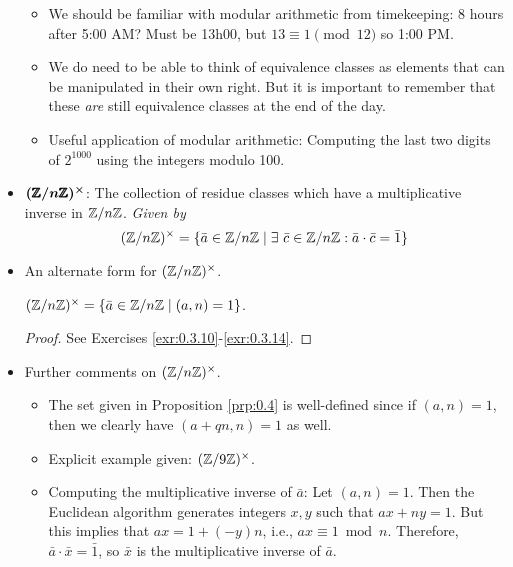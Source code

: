 \documentclass[../notes.tex]{subfiles}
\begin{document}
\begin{itemize}
\begin{itemize}
        \item We should be familiar with modular arithmetic from timekeeping: 8 hours after 5:00 AM? Must be 13h00, but $13\equiv 1\pmod 12$ so 1:00 PM.
        \item We do need to be able to think of equivalence classes as elements that can be manipulated in their own right. But it is important to remember that these \emph{are} still equivalence classes at the end of the day.
        \item Useful application of modular arithmetic: Computing the last two digits of $2^{1000}$ using the integers modulo 100.
    \end{itemize}
    \item $\bm{(\pmb{\mathbb{Z}}/n\pmb{\mathbb{Z}})^\times}$: The collection of residue classes which have a multiplicative inverse in $\mathbb{Z}/n\mathbb{Z}$. \emph{Given by}
    \begin{equation*}
        (\Z/n\Z)^\times = \{\bar{a}\in\Z/n\Z\mid \exists\ \bar{c}\in\Z/n\Z:\bar{a}\cdot\bar{c}=\bar{1}\}
    \end{equation*}
    \item An alternate form for $(\mathbb{Z}/n\mathbb{Z})^\times$.
    \begin{proposition}\label{prp:0.4}
        $(\mathbb{Z}/n\mathbb{Z})^\times=\{\bar{a}\in\mathbb{Z}/n\mathbb{Z}\mid(a,n)=1\}$.
        \begin{proof}
            See Exercises \ref{exr:0.3.10}-\ref{exr:0.3.14}.
        \end{proof}
    \end{proposition}
    \item Further comments on $(\mathbb{Z}/n\mathbb{Z})^\times$.
    \begin{itemize}
        \item The set given in Proposition \ref{prp:0.4} is well-defined since if $(a,n)=1$, then we clearly have $(a+qn,n)=1$ as well.
        \item Explicit example given: $(\mathbb{Z}/9\mathbb{Z})^\times$.
        \item Computing the multiplicative inverse of $\bar{a}$: Let $(a,n)=1$. Then the Euclidean algorithm generates integers $x,y$ such that $ax+ny=1$. But this implies that $ax=1+(-y)n$, i.e., $ax\equiv 1\bmod n$. Therefore, $\bar{a}\cdot\bar{x}=\bar{1}$, so $\bar{x}$ is the multiplicative inverse of $\bar{a}$.
    \end{itemize}
\end{itemize}
\end{document}
